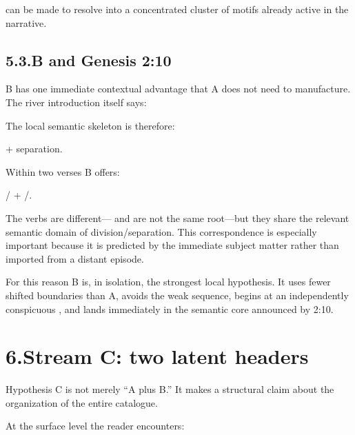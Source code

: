 can be made to resolve into a concentrated cluster of motifs already active in the narrative.

\subsection*{5.3.\quad B and Genesis 2:10}

B has one immediate contextual advantage that A does not need to manufacture.  The river introduction itself says:


The local semantic skeleton is therefore:

\begin{center}
 \quad + \quad separation.
\end{center}

Within two verses B offers:

\begin{center}
/ \quad + \quad {}/.
\end{center}

The verbs are different--- and  are not the same root---but they share the relevant semantic domain of division/separation.  This correspondence is especially important because it is predicted by the immediate subject matter rather than imported from a distant episode.

For this reason B is, in isolation, the strongest local hypothesis.  It uses fewer shifted boundaries than A, avoids the weak  sequence, begins at an independently conspicuous , and lands immediately in the semantic core announced by 2:10.

\section*{6.\quad Stream C: two latent headers}

Hypothesis C is not merely ``A plus B.''  It makes a structural claim about the organization of the entire catalogue.

At the surface level the reader encounters:

